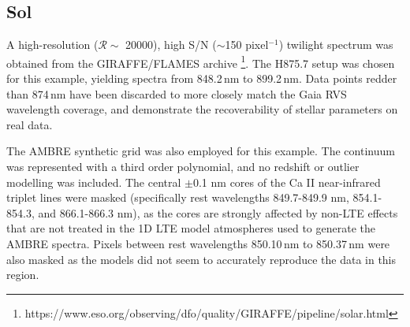 \documentclass{aastex}
\begin{document}
\subsection{Sol}
\label{sec:sun}
A high-resolution ($\mathcal{R} \sim$ 20000), high S/N ($\sim{}$150 pixel$^{-1}$) 
twilight spectrum was obtained from the GIRAFFE/FLAMES archive
\footnote{https://www.eso.org/observing/dfo/quality/GIRAFFE/pipeline/solar.html}. 
The H875.7 setup was chosen for this example, yielding spectra from 848.2\,nm to 
899.2\,nm. Data points redder than 874\,nm have been discarded to more closely 
match the Gaia RVS wavelength coverage, and demonstrate the recoverability of 
stellar parameters on real data.

The AMBRE \citep{ambre} synthetic grid was also employed for this example. The 
continuum was represented with a third order polynomial, and no redshift or 
outlier modelling was included. The central $\pm$0.1 nm cores of the Ca II 
near-infrared triplet lines were masked (specifically rest wavelengths 
849.7-849.9 nm, 854.1-854.3, and 866.1-866.3 nm), as the cores are strongly 
affected by non-LTE effects that are not treated in the 1D LTE model atmospheres 
used to generate the AMBRE spectra. Pixels between rest wavelengths 850.10\,nm 
to 850.37\,nm were also masked as the models did not seem to accurately reproduce 
the data in this region. 
\end{document}
